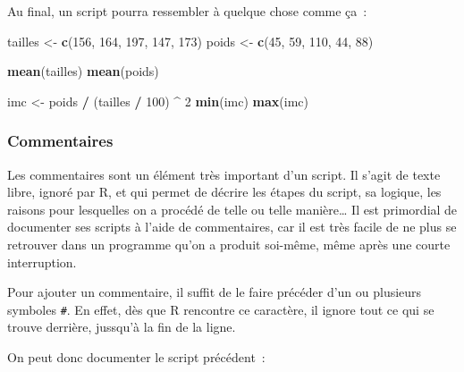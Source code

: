 \documentclass[12pt,]{book}
\newenvironment{Shaded}{\begin{snugshade}}{\end{snugshade}}
\newcommand{\DecValTok}[1]{\textcolor[rgb]{0.00,0.00,0.81}{#1}}
\newcommand{\KeywordTok}[1]{\textcolor[rgb]{0.13,0.29,0.53}{\textbf{#1}}}
\newcommand{\NormalTok}[1]{#1}
\newcommand{\OperatorTok}[1]{\textcolor[rgb]{0.81,0.36,0.00}{\textbf{#1}}}
\newcommand{\StringTok}[1]{\textcolor[rgb]{0.31,0.60,0.02}{#1}}
\begin{document}
Au final, un script pourra ressembler à quelque chose comme ça~:

\begin{Shaded}
\begin{Highlighting}[]
\NormalTok{tailles <-}\StringTok{ }\KeywordTok{c}\NormalTok{(}\DecValTok{156}\NormalTok{, }\DecValTok{164}\NormalTok{, }\DecValTok{197}\NormalTok{, }\DecValTok{147}\NormalTok{, }\DecValTok{173}\NormalTok{)}
\NormalTok{poids <-}\StringTok{ }\KeywordTok{c}\NormalTok{(}\DecValTok{45}\NormalTok{, }\DecValTok{59}\NormalTok{, }\DecValTok{110}\NormalTok{, }\DecValTok{44}\NormalTok{, }\DecValTok{88}\NormalTok{)}

\KeywordTok{mean}\NormalTok{(tailles)}
\KeywordTok{mean}\NormalTok{(poids)}

\NormalTok{imc <-}\StringTok{ }\NormalTok{poids }\OperatorTok{/}\StringTok{ }\NormalTok{(tailles }\OperatorTok{/}\StringTok{ }\DecValTok{100}\NormalTok{) }\OperatorTok{^}\StringTok{ }\DecValTok{2}
\KeywordTok{min}\NormalTok{(imc)}
\KeywordTok{max}\NormalTok{(imc)}
\end{Highlighting}
\end{Shaded}

\hypertarget{commentaires}{%
\subsubsection{Commentaires}\label{commentaires}}

Les commentaires sont un élément très important d'un script. Il s'agit de texte libre, ignoré par R, et qui permet de décrire les étapes du script, sa logique, les raisons pour lesquelles on a procédé de telle ou telle manière\ldots{} Il est primordial de documenter ses scripts à l'aide de commentaires, car il est très facile de ne plus se retrouver dans un programme qu'on a produit soi-même, même après une courte interruption.

Pour ajouter un commentaire, il suffit de le faire précéder d'un ou plusieurs symboles \texttt{\#}. En effet, dès que R rencontre ce caractère, il ignore tout ce qui se trouve derrière, jussqu'à la fin de la ligne.

On peut donc documenter le script précédent~:
\end{document}
